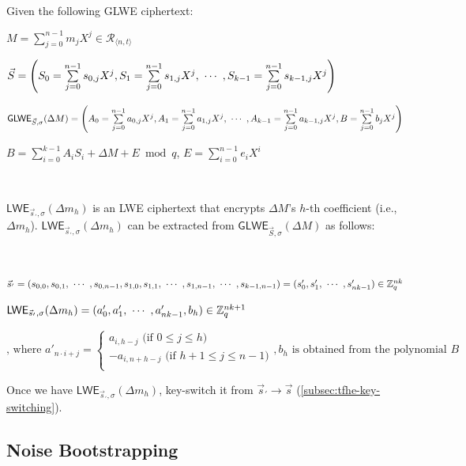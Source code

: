 \begin{tcolorbox}[title={\textbf{\tboxlabel{\ref*{subsec:tfhe-extraction}} GLWE Ciphertext's Coefficient Extraction}}]
Given the following GLWE ciphertext: 

$M = \sum\limits_{j=0}^{n-1}m_jX^j \in \mathcal{R}_{\langle n, t \rangle}$

$\vec{S} = \left(S_0 = \sum\limits_{j=0}^{n-1}s_{0,j}X^j, S_1 = \sum\limits_{j=0}^{n-1}s_{1,j}X^j, \text{ } \text{$\cdots$} \text{ }, S_{k-1} = \sum\limits_{j=0}^{n-1}s_{k-1,j}X^j \right)$

$\textsf{GLWE}_{\vec{S}, \sigma}(\Delta M) = \left(A_0 = \sum\limits_{j=0}^{n-1}a_{0,j}X^j, A_1 = \sum\limits_{j=0}^{n-1}a_{1,j}X^j, \text{ } \text{$\cdots$} \text{ }, A_{k-1} = \sum\limits_{j=0}^{n-1}a_{k-1,j}X^j, B = \sum\limits_{j=0}^{n-1}b_{j}X^j\right)$

$B = \sum\limits_{i=0}^{k-1}A_iS_i + \Delta M + E \bmod q$, \text{ } $E = \sum\limits_{i=0}^{n-1}e_iX^i$

$ $

$\textsf{LWE}_{\vec{s}_{'}, \sigma}(\Delta m_h)$ is an LWE ciphertext that encrypts $\Delta M$'s $h$-th coefficient (i.e., $\Delta m_h$). $\textsf{LWE}_{\vec{s}_{'}, \sigma}(\Delta m_h)$ can be extracted from $\textsf{GLWE}_{\vec{S}, \sigma}(\Delta M)$ as follows: 

$ $

$\vec{s}_{'} = (s_{0,0}, s_{0,1}, \text{ } \text{$\cdots$} \text{ }, s_{0,n-1}, s_{1,0}, s_{1,1}, \text{ } \text{$\cdots$} \text{ }, s_{1, n-1}, \text{ } \text{$\cdots$} \text{ }, s_{k-1, n-1}) = (s'_0, s'_1, \text{ } \text{$\cdots$} \text{ }, s'_{nk-1} ) \in \mathbb{Z}_q^{nk}$

$\textsf{LWE}_{\vec{s}_{'}, \sigma}(\Delta m_h) = (a_0', a_1', \text{ } \text{$\cdots$} \text{ } , a_{nk-1}', b_h) \in \mathbb{Z}_q^{nk + 1}$


\[
    \text{, where } a'_{n \cdot i + j} =   
\begin{cases}
    a_{i,h - j} \text{ (if } 0 \leq j \leq h\text{)}\\
    -a_{i,n + h - j} \text{ (if } h+1 \leq j \leq n-1\text{)}\\
\end{cases}
, b_h \text{ is obtained from the polynomial } B
\]

Once we have $\textsf{LWE}_{\vec{s}_{'}, \sigma}(\Delta m_h)$, key-switch it from $\vec{s}_{'} \rightarrow \vec{s}$ (\autoref{subsec:tfhe-key-switching}).

\end{tcolorbox}



\subsection{Noise Bootstrapping}
\label{subsec:tfhe-noise-bootstrapping}


